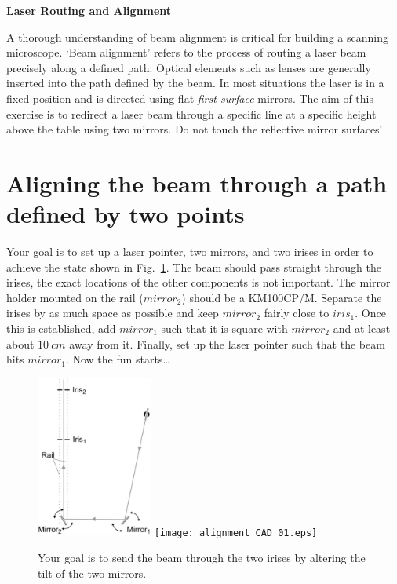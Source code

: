 \documentclass[a4paper]{report}
\begin{document}
\setcounter{secnumdepth}{2}

\begin{center}
\textbf{\Large{Laser Routing and Alignment}}
\end{center}

A thorough understanding of beam alignment is critical for building a scanning microscope. 
`Beam alignment' refers to the process of routing a laser beam precisely along a defined path. 
Optical elements such as lenses are generally inserted into the path defined by the beam. 
In most situations the laser is in a fixed position and is directed using flat \textit{first surface} mirrors.
The aim of this exercise is to redirect a laser beam through a specific line at a specific height above the table using two mirrors.
Do not touch the reflective mirror surfaces!


\section{Aligning the beam through a path defined by two points}
Your goal is to set up a laser pointer, two mirrors, and two irises in order to achieve the state shown in Fig.~\ref{fig:ex1}. 
The beam should pass straight through the irises, the exact locations of the other components is not important. 
The mirror holder mounted on the rail ($mirror_2$) should be a KM100CP/M. 
Separate the irises by as much space as possible and keep $mirror_2$ fairly close to $iris_1$.
Once this is established, add $mirror_1$ such that it is square with $mirror_2$ and at least about $10~cm$ away from it. 
Finally, set up the laser pointer such that the beam hits $mirror_1$.
Now the fun starts\ldots


\begin{figure}[h]
\center
\includegraphics[width=1.50in]{laser_alignment_exercise_basic.eps}
\texttt{[image: alignment\_CAD\_01.eps]}
\caption{Your goal is to send the beam through the two irises by altering the tilt of the two mirrors.}
\label{fig:ex1}
\end{figure}
\end{document}
